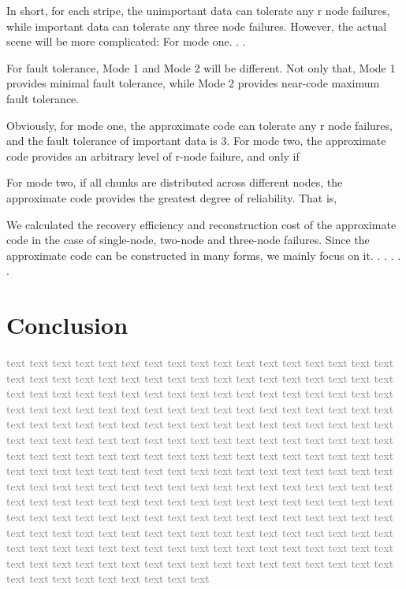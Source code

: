 \documentclass[sigconf]{acmart}
\begin{document}
In short, for each stripe, the unimportant data can tolerate any r node failures, while important data can tolerate any three node failures. However, the actual scene will be more complicated:
For mode one. . .


For fault tolerance, Mode 1 and Mode 2 will be different. Not only that, Mode 1 provides minimal fault tolerance, while Mode 2 provides near-code maximum fault tolerance.

Obviously, for mode one, the approximate code can tolerate any r node failures, and the fault tolerance of important data is 3. For mode two, the approximate code provides an arbitrary level of r-node failure, and only if

For mode two, if all chunks are distributed across different nodes, the approximate code provides the greatest degree of reliability. That is,



We calculated the recovery efficiency and reconstruction cost of the approximate code in the case of single-node, two-node and three-node failures. Since the approximate code can be constructed in many forms, we mainly focus on it. . . . . .




\section{Conclusion}\label{Conclusion}

\textcolor{gray}{
    text text text text text text text text text text text text text text text text text text text text text text text text text text text text text text text text text text text text text text text text text text text text text text text text text text text text text text text text text text text text text text text text text text text text text text text text text text text text text text text text text text text text text text text text text text text text text text text text text text text text text text text text text text text text text text text text text text text text text text text text text text text text text text text text text text text text text text text text text text text text text text text text text text text text text text text text text text text text text text text text text text text text text text text text text text text text text text text text text text text text text text
    text text text text text text text text text text text text text text text text text text text text text text text text text text text text text text text text text text text text text text text text text text text text text text text text text text text text text text text text text text text text text text text text text
}


\begin{acks}

\end{acks}





\end{document}
